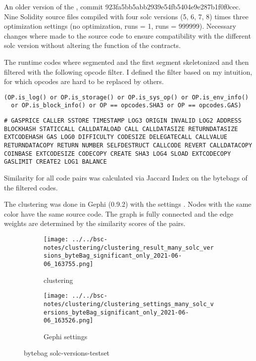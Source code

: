\documentclass[../main.tex]{subfiles}
\begin{document}
An older version of the , commit 923fa5bb5abb2939e54fb5404e9e287b1f0f0cec.
Nine Solidity source files compiled with four solc versions (5, 6, 7, 8) times three optimization
settings (no optimization, runs = 1, runs = 999999).
Necessary changes where made to the source code to ensure compatibility with the different solc
version without altering the function of the contracts.

The runtime codes where segmented and the first segment skeletonized and then filtered with the following opcode filter. I defined the filter based on my intuition, for which opcodes are hard to be replaced by others.
\begin{lstlisting}[style=pymd]
(OP.is_log() or OP.is_storage() or OP.is_sys_op() or OP.is_env_info()
  or OP.is_block_info() or OP == opcodes.SHA3 or OP == opcodes.GAS)
\end{lstlisting}
\begin{lstlisting}[style=pysm]
# GASPRICE CALLER SSTORE TIMESTAMP LOG3 ORIGIN INVALID LOG2 ADDRESS BLOCKHASH STATICCALL CALLDATALOAD CALL CALLDATASIZE RETURNDATASIZE EXTCODEHASH GAS LOG0 DIFFICULTY CODESIZE DELEGATECALL CALLVALUE RETURNDATACOPY RETURN NUMBER SELFDESTRUCT CALLCODE REVERT CALLDATACOPY COINBASE EXTCODESIZE CODECOPY CREATE SHA3 LOG4 SLOAD EXTCODECOPY GASLIMIT CREATE2 LOG1 BALANCE
\end{lstlisting}

Similarity for all code pairs was calculated via Jaccard Index on the bytebags of the filtered codes.

The clustering  was done in Gephi (0.9.2) with the settings .
Nodes with the same color have the same source code.
The graph is fully connected and the edge weights are determined by the similarity scores of the pairs.

\begin{figure}[ht!]
  \begin{subfigure}[c]{.6\linewidth}
    \texttt{[image: ../../bsc-notes/clustering/clustering\_result\_many\_solc\_versions\_byteBag\_significant\_only\_2021-06-06\_163755.png]}
    \caption{clustering}
    \label{fig:solc_bytebag_cluster}
  \end{subfigure}%
  \begin{subfigure}[c]{.4\linewidth}
    \texttt{[image: ../../bsc-notes/clustering/clustering\_settings\_many\_solc\_versions\_byteBag\_significant\_only\_2021-06-06\_163526.png]}
    \caption{Gephi settings}
    \label{fig:solc_bytebag_cluster_settings}
  \end{subfigure}
  \caption{bytebag solc-versions-testset}
\end{figure}
\end{document}
